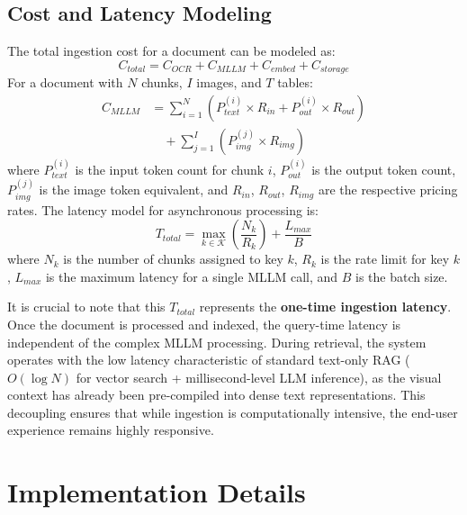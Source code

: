 \documentclass[conference]{IEEEtran}
\begin{document}
\subsection{Cost and Latency Modeling}
The total ingestion cost for a document can be modeled as:
\begin{equation}
C_{total} = C_{OCR} + C_{MLLM} + C_{embed} + C_{storage}
\end{equation}
For a document with $N$ chunks, $I$ images, and $T$ tables:
\begin{align}
C_{MLLM} &= \sum_{i=1}^{N} \left( P_{text}^{(i)} \times R_{in} + P_{out}^{(i)} \times R_{out} \right) \\
&\quad + \sum_{j=1}^{I} \left( P_{img}^{(j)} \times R_{img} \right)
\end{align}
where $P_{text}^{(i)}$ is the input token count for chunk $i$, $P_{out}^{(i)}$ is the output token count, $P_{img}^{(j)}$ is the image token equivalent, and $R_{in}$, $R_{out}$, $R_{img}$ are the respective pricing rates.
The latency model for asynchronous processing is:
\begin{equation}
T_{total} = \max_{k \in \mathcal{K}} \left( \frac{N_k}{R_k} \right) + \frac{L_{max}}{B}
\end{equation}
where $N_k$ is the number of chunks assigned to key $k$, $R_k$ is the rate limit for key $k$, $L_{max}$ is the maximum latency for a single MLLM call, and $B$ is the batch size.

It is crucial to note that this $T_{total}$ represents the \textbf{one-time ingestion latency}. Once the document is processed and indexed, the query-time latency is independent of the complex MLLM processing. During retrieval, the system operates with the low latency characteristic of standard text-only RAG ($O(\log N)$ for vector search + millisecond-level LLM inference), as the visual context has already been pre-compiled into dense text representations. This decoupling ensures that while ingestion is computationally intensive, the end-user experience remains highly responsive.

\section{Implementation Details}
\end{document}
